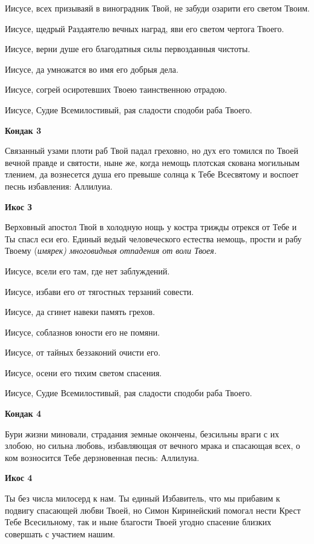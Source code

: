 Иисусе, всех призываяй в виноградник Твой, не забуди озарити его светом Твоим. 

Иисусе, щедрый Раздаятелю вечных наград, яви его светом чертога Твоего. 

Иисусе, верни душе его благодатныя силы первозданныя чистоты. 

Иисусе, да умножатся во имя его добрыя дела. 

Иисусе, согрей осиротевших Твоею таинственною отрадою. 

Иисусе, Судие Всемилостивый, рая сладости сподоби раба Твоего.


\medskip


\bfseries Кондак 3\normalfont{}


Связанный узами плоти раб Твой падал греховно, но дух его томился по Твоей вечной правде и святости, ныне же, когда немощь плотская скована могильным тлением, да вознесется душа его превыше солнца к Тебе Всесвятому и воспоет песнь избавления: Аллилуиа.


\medskip


\bfseries Икос З\normalfont{}


Верховный апостол Твой в холодную нощь у костра трижды отрекся от Тебе и Ты спасл еси его. Единый ведый человеческого естества немощь, прости и рабу Твоему (\itshape имярек\normalfont{}) многовидныя отпадения от воли Твоея. 

Иисусе, всели его там, где нет заблуждений. 

Иисусе, избави его от тягостных терзаний совести. 

Иисусе, да сгинет навеки память грехов. 

Иисусе, соблазнов юности его не помяни. 

Иисусе, от тайных беззаконий очисти его. 

Иисусе, осени его тихим светом спасения. 

Иисусе, Судие Всемилостивый, рая сладости сподоби раба Твоего.


\medskip


\bfseries Кондак 4\normalfont{}


Бури жизни миновали, страдания земные окончены, безсильны враги с их злобою, но сильна любовь, избавляющая от вечного мрака и спасающая всех, о ком возносится Тебе дерзновенная песнь: Аллилуиа.


\medskip


\bfseries Икос 4\normalfont{}


Ты без числа милосерд к нам. Ты единый Избавитель, что мы прибавим к подвигу спасающей любви Твоей, но Симон Киринейский помогал нести Крест Тебе Всесильному, так и ныне благости Твоей угодно спасение близких совершать с участием нашим. 

